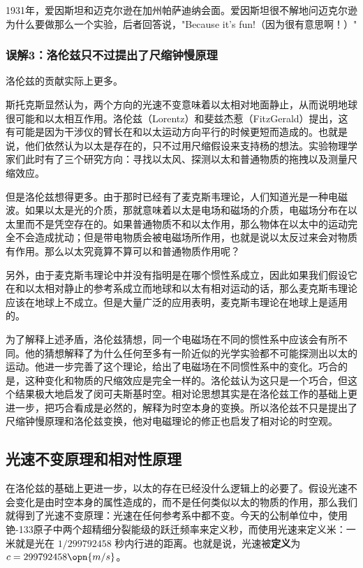 1931年，爱因斯坦和迈克尔逊在加州帕萨迪纳会面。爱因斯坦很不解地问迈克尔逊为什么要做那么一个实验，后者回答说，"Because it's fun!（因为很有意思啊！）" 

\subsubsection{误解3：洛伦兹只不过提出了尺缩钟慢原理}

洛伦兹的贡献实际上更多。

斯托克斯显然认为，两个方向的光速不变意味着以太相对地面静止，从而说明地球很可能和以太相互作用。洛伦兹（Lorentz）和斐兹杰惹（FitzGerald）提出，这有可能是因为干涉仪的臂长在和以太运动方向平行的时候更短而造成的。也就是说，他们依然认为以太是存在的，只不过用尺缩假设来支持杨的想法。实验物理学家们此时有了三个研究方向：寻找以太风、探测以太和普通物质的拖拽以及测量尺缩效应。

但是洛伦兹想得更多。由于那时已经有了麦克斯韦理论，人们知道光是一种电磁波。如果以太是光的介质，那就意味着以太是电场和磁场的介质，电磁场分布在以太里而不是凭空存在的。如果普通物质不和以太作用，那么物体在以太中的运动完全不会造成扰动；但是带电物质会被电磁场所作用，也就是说以太反过来会对物质有作用。那么以太究竟算不算可以和普通物质作用呢？

另外，由于麦克斯韦理论中并没有指明是在哪个惯性系成立，因此如果我们假设它在和以太相对静止的参考系成立而地球和以太有相对运动的话，那么麦克斯韦理论应该在地球上不成立。但是大量广泛的应用表明，麦克斯韦理论在地球上是适用的。

为了解释上述矛盾，洛伦兹猜想，同一个电磁场在不同的惯性系中应该会有所不同。他的猜想解释了为什么任何至多有一阶近似的光学实验都不可能探测出以太的运动。他进一步完善了这个理论，给出了电磁场在不同惯性系中的变化。巧合的是，这种变化和物质的尺缩效应是完全一样的。洛伦兹认为这只是一个巧合，但这个结果极大地启发了闵可夫斯基时空。相对论思想其实是在洛伦兹工作的基础上更进一步，把巧合看成是必然的，解释为时空本身的变换。所以洛伦兹不只是提出了尺缩钟慢原理和洛伦兹变换，他对电磁理论的修正也启发了相对论的时空观。

\subsection{光速不变原理和相对性原理}

在洛伦兹的基础上更进一步，以太的存在已经没什么逻辑上的必要了。假设光速不会变化是由时空本身的属性造成的，而不是任何类似以太的物质的作用，那么我们就得到了光速不变原理：光速在任何参考系中都不变。今天的公制单位中，使用铯-133原子中两个超精细分裂能级的跃迁频率来定义秒，而使用光速来定义米：一米就是光在 $1/299792458$ 秒内行进的距离。也就是说，光速被\textbf{定义}为 $c=299792458\opn{m/s}$。

